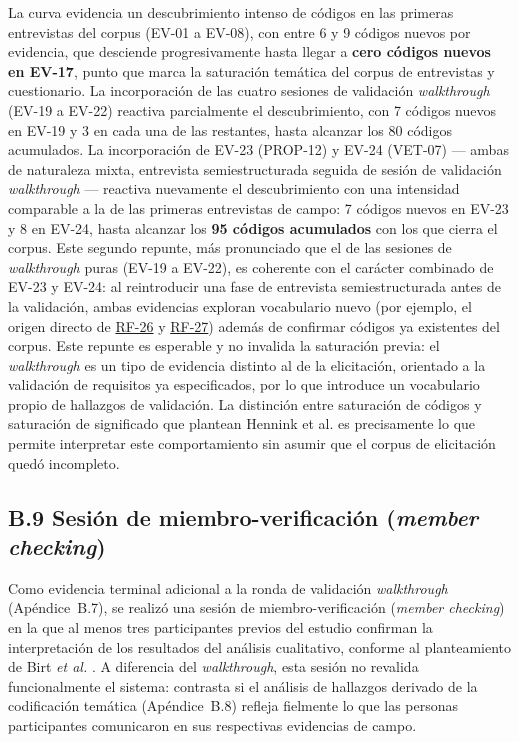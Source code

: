 \documentclass[journal,onecolumn]{IEEEtran}
\begin{document}
	La curva evidencia un descubrimiento intenso de códigos en las primeras
	entrevistas del corpus (EV-01 a EV-08), con entre 6 y 9 códigos nuevos
	por evidencia, que desciende progresivamente hasta llegar a \textbf{cero
	códigos nuevos en EV-17}, punto que marca la saturación temática del
	corpus de entrevistas y cuestionario. La incorporación de las cuatro
	sesiones de validación \emph{walkthrough} (EV-19 a EV-22) reactiva
	parcialmente el descubrimiento, con 7 códigos nuevos en EV-19 y 3 en cada
	una de las restantes, hasta alcanzar los 80 códigos acumulados. La
	incorporación de EV-23 (PROP-12) y EV-24 (VET-07) --- ambas de
	naturaleza mixta, entrevista semiestructurada seguida de sesión de
	validación \emph{walkthrough} --- reactiva nuevamente el descubrimiento
	con una intensidad comparable a la de las primeras entrevistas de campo:
	7 códigos nuevos en EV-23 y 8 en EV-24, hasta alcanzar los \textbf{95
	códigos acumulados} con los que cierra el corpus. Este segundo repunte,
	más pronunciado que el de las sesiones de \emph{walkthrough} puras
	(EV-19 a EV-22), es coherente con el carácter combinado de EV-23 y
	EV-24: al reintroducir una fase de entrevista semiestructurada antes de
	la validación, ambas evidencias exploran vocabulario nuevo (por ejemplo,
	el origen directo de \hyperref[tab:RF-26]{RF-26} y \hyperref[tab:RF-27]{RF-27}) además de confirmar códigos ya
	existentes del corpus. Este repunte es esperable y no invalida la
	saturación previa: el \emph{walkthrough} es un tipo de evidencia
	distinto al de la elicitación, orientado a la validación de requisitos
	ya especificados, por lo que introduce un vocabulario propio
	de hallazgos de validación. La distinción entre saturación de códigos y
	saturación de significado que plantean Hennink et al. \cite{hennink2017} es
	precisamente lo que permite interpretar este comportamiento sin asumir que
	el corpus de elicitación quedó incompleto.

	\subsection*{B.9 Sesión de miembro-verificación (\emph{member checking})}
	\label{sec:memberchecking}

	Como evidencia terminal adicional a la ronda de validación \emph{walkthrough}
	(Apéndice~B.7), se realizó una sesión de miembro-verificación (\emph{member
		checking}) en la que al menos tres participantes previos del estudio
	confirman la interpretación de los resultados del análisis cualitativo,
	conforme al planteamiento de Birt \emph{et al.} \cite{birt2016}. A
	diferencia del \emph{walkthrough}, esta sesión no revalida funcionalmente
	el sistema: contrasta si el análisis de hallazgos derivado de la
	codificación temática (Apéndice~B.8) refleja fielmente lo que las
	personas participantes comunicaron en sus respectivas evidencias de
	campo.
\end{document}
